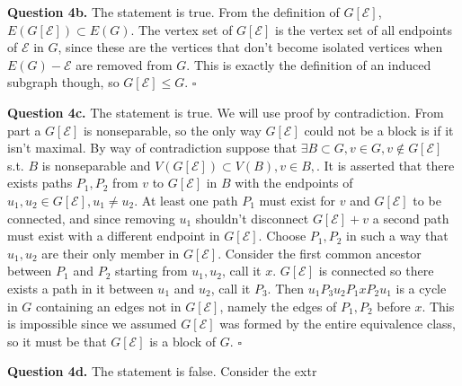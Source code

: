\documentclass[letterpaper, reqno,11pt]{article}
\begin{document}

{\medskip\noindent\bf Question 4b.} The statement is true. From the definition of $G[\mathcal E]$, $E(G[\mathcal E])\subset E(G)$. The vertex set of $G[\mathcal E]$ is the vertex set of all endpoints of $\mathcal E$ in $G$, since these are the vertices that don't become isolated vertices when $E(G)-\mathcal E$ are removed from $G$. This is exactly the definition of an induced subgraph though, so $G[\mathcal E]\leq G$. $\square$

{\medskip\noindent\bf Question 4c.} The statement is true. We will use proof by contradiction. From part a $G[\mathcal E]$ is nonseparable, so the only way $G[\mathcal E]$ could not be a block is if it isn't maximal. By way of contradiction suppose that $\exists B\subset G, v\in G, v\notin G[\mathcal E]$ s.t. $B$ is nonseparable and $V(G[\mathcal E])\subset V(B), v\in B,$. It is asserted that there exists paths $P_1,P_2$ from $v$ to $G[\mathcal E]$ in $B$ with the endpoints of $u_1,u_2\in G[\mathcal E], u_1\neq u_2$. At least one path $P_1$ must exist for $v$ and $G[\mathcal E]$ to be connected, and since removing $u_1$ shouldn't disconnect $G[\mathcal E]+v$ a second path must exist with a different endpoint in $G[\mathcal E]$. Choose $P_1,P_2$ in such a way that $u_1,u_2$ are their only member in $G[\mathcal E]$. Consider the first common ancestor between $P_1$ and $P_2$ starting from $u_1,u_2$, call it $x$. $G[\mathcal E]$ is connected so there exists a path in it between $u_1$ and $u_2$, call it $P_3$. Then $u_1P_3u_2P_1xP_2u_1$ is a cycle in $G$ containing an edges not in $G[\mathcal E]$, namely the edges of $P_1,P_2$ before $x$. This is impossible since we assumed $G[\mathcal E]$ was formed by the entire equivalence class, so it must be that $G[\mathcal E]$ is a block of $G$. $\square$

{\medskip\noindent\bf Question 4d.} The statement is false. Consider the extr
\end{document}

